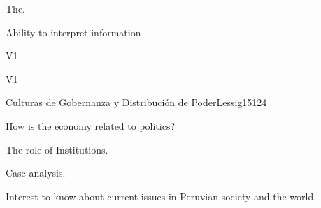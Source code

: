 \begin{syllabus}


\begin{justification}
The. 
\end{justification}

\begin{goals}
\item Ability to interpret information
\end{goals}

\begin{outcomes}{V1}
    \item {}
    \item {}
    \item {}
    
\end{outcomes}

\begin{competences}{V1}
    \item {}
    \item {}
    \item {}
    \item {}
\end{competences}

\begin{unit}{Culturas de Gobernanza y Distribución de Poder}{}{Lessig15}{12}{4}
   \begin{topics}
      \item How is the economy related to politics?
      \item The role of Institutions.
      \item Case analysis.
   \end{topics}
   \begin{learningoutcomes}
      \item Interest to know about current issues in Peruvian society and the world.
   \end{learningoutcomes}
\end{unit}

\begin{coursebibliography}
\end{coursebibliography}

\end{syllabus}
